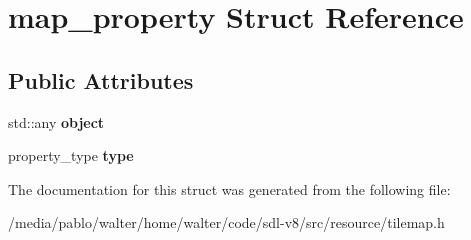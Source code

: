 \hypertarget{structmap__property}{}\section{map\+\_\+property Struct Reference}
\label{structmap__property}
\subsection*{Public Attributes}
\begin{DoxyCompactItemize}
\item 
\mbox{\label{structmap__property_a562a2e9b99cc27ee4ed63eb277b69912}} 
std\+::any {\bfseries object}
\item 
\mbox{\label{structmap__property_adda3d5891bd3def446b496a5091f6d26}} 
property\+\_\+type {\bfseries type}
\end{DoxyCompactItemize}


The documentation for this struct was generated from the following file\+:\begin{DoxyCompactItemize}
\item 
/media/pablo/walter/home/walter/code/sdl-\/v8/src/resource/tilemap.\+h\end{DoxyCompactItemize}
